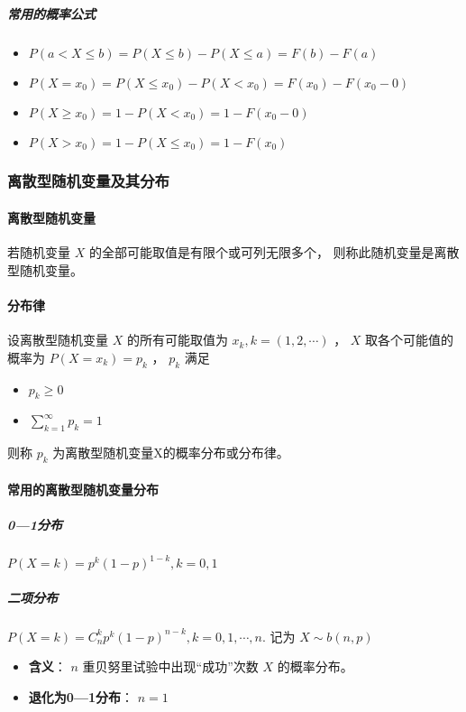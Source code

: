 \subparagraph{常用的概率公式}
\begin{itemize}[leftmargin=\subparitemindent]
    \item  $ P(a < X \leqslant b) = P(X \leqslant b) - P(X \leqslant a) = F(b) - F(a) $ 
    \item  $ P(X = x_0) = P(X \leqslant x_0) - P(X < x_0) = F(x_0) - F(x_0 - 0) $ 
    \item  $ P(X \geqslant x_0) = 1 - P(X < x_0) = 1 - F(x_0 - 0) $ 
    \item  $ P(X > x_0) = 1 - P(X \leqslant x_0) = 1 - F(x_0) $ 
\end{itemize}

\subsubsection{离散型随机变量及其分布}

\paragraph{离散型随机变量} 若随机变量 $ X $ 的全部可能取值是有限个或可列无限多个，
则称此随机变量是离散型随机变量。

\paragraph{分布律} 设离散型随机变量 $ X $ 的所有可能取值为 $ x_k,k=(1,2,\cdots) $ ，
 $ X $ 取各个可能值的概率为 $ P(X = x_k) = p_k $ ， $ p_k $ 满足
\begin{itemize}[leftmargin=\paritemindent]
    \item  $ p_k \geqslant 0 $ 
    \item  $ \sum_{k=1}^\infty p_k = 1 $ 
\end{itemize}
则称 $ p_k $ 为离散型随机变量X的概率分布或分布律。

\paragraph{常用的离散型随机变量分布}

\subparagraph{0—1分布}  $ P(X = k) = p^k(1-p)^{1-k}, k = 0,1 $ 

\subparagraph{二项分布}  $ P(X=k) = C_n^k p^k (1-p)^{n-k}, k = 0,1,\cdots,n. $ 记为 $ X \sim b(n,p) $
\begin{itemize}[leftmargin=\subparitemindent]
    \item \textbf{含义}：   $ n $  重贝努里试验中出现“成功”次数 $ X $ 的概率分布。
    \item \textbf{退化为0—1分布}：  $ n=1 $ 
\end{itemize}

